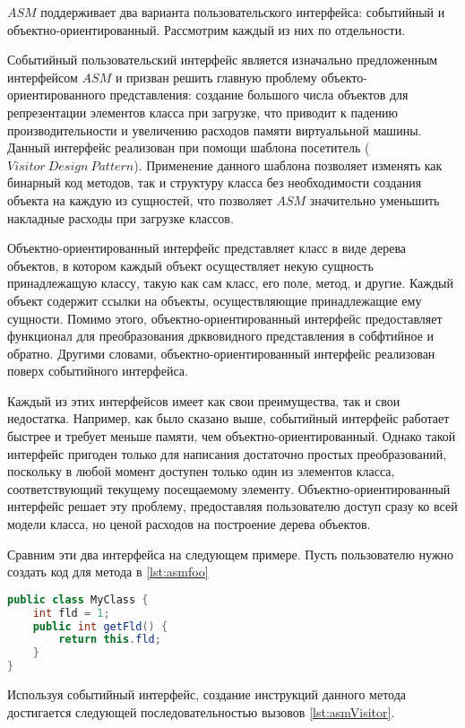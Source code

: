 $ASM$ поддерживает два варианта пользовательского интерфейса: событийный и объектно-ориентированный. Рассмотрим каждый из них по отдельности.

Событийный пользовательский интерфейс является изначально предложенным интерфейсом $ASM$ и призван решить главную проблему объекто-ориентированного представления: создание большого числа объектов для репрезентации элементов класса при загрузке, что приводит к падению производительности и увеличению расходов памяти виртуалььной машины. Данный интерфейс реализован при помощи шаблона посетитель ($Visitor~Design~Pattern$). Применение данного шаблона позволяет изменять как бинарный код методов, так и структуру класса без необходимости создания объекта на каждую из сущностей, что позволяет $ASM$ значительно уменьшить накладные расходы при загрузке классов.

Объектно-ориентированный интерфейс представляет класс в виде дерева объектов, в котором каждый объект осуществляет некую сущность принадлежащую классу, такую как сам класс, его поле, метод, и другие. Каждый объект содержит ссылки на объекты, осуществляющие принадлежащие ему сущности. Помимо этого, объектно-ориентированный интерфейс предоставляет функционал для преобразования дрквовидного представления в собфтийное и обратно. Другими словами, объектно-ориентированный интерфейс реализован поверх событийного интерфейса.

Каждый из этих интерфейсов имеет как свои преимущества, так и свои недостатка. Например, как было сказано выше, событийный интерфейс работает быстрее и требует меньше памяти, чем объектно-ориентированный. Однако такой интерфейс пригоден только для написания достаточно простых преобразований, поскольку в любой момент доступен только один из элементов класса, соответствующий текущему посещаемому элементу. Объектно-ориентированный интерфейс решает эту проблему, предоставляя пользователю доступ сразу ко всей модели класса, но ценой расходов на построение дерева объектов.

Сравним эти два интерфейса на следующем примере. Пусть пользователю нужно создать код для метода в \autoref{lst:asmfoo}

\begin{lstlisting}[language=Java, caption=Необходимый метод., label=lst:asmfoo]
public class MyClass {
    int fld = 1;
    public int getFld() {
        return this.fld;
    }
}
\end{lstlisting}

Используя событийный интерфейс, создание инструкций данного метода достигается следующей последовательностью вызовов \autoref{lst:asmVisitor}.

